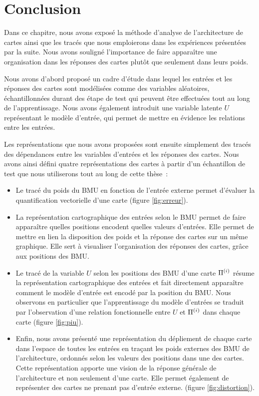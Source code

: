 \documentclass[../main]{subfiles}
\begin{document}
\section{Conclusion}

Dans ce chapitre, nous avons exposé la méthode d'analyse de l'architecture de cartes ainsi que les tracés que nous emploierons dans les expériences présentées par la suite. 
Nous avons souligné l'importance de faire apparaître une organisation dans les réponses des cartes plutôt que seulement dans leurs poids.

Nous avons d'abord proposé un cadre d'étude dans lequel les entrées et les réponses des cartes sont modélisées comme des variables aléatoires, échantillonnées durant des étape de test qui peuvent être effectuées tout au long de l'apprentissage.
Nous avons également introduit une variable latente $U$ représentant le modèle d'entrée, qui permet de mettre en évidence les relations entre les entrées. 


Les représentations que nous avons proposées sont ensuite simplement des tracés des dépendances entre les variables d'entrées et les réponses des cartes. Nous avons ainsi défini quatre représentations des cartes à partir d'un échantillon de test que nous utiliserons tout au long de cette thèse~:
\begin{itemize}
    \item Le tracé du poids du BMU en fonction de l'entrée externe permet d'évaluer la quantification vectorielle d'une carte (figure \ref{fig:erreur}).
    \item La représentation cartographique des entrées selon le BMU permet de faire apparaître quelles positions encodent quelles valeurs d'entrées. Elle permet de mettre en lien la disposition des poids et la réponse des cartes sur un même graphique. Elle sert à visualiser l'organisation des réponses des cartes, grâce aux positions des BMU.
    \item Le tracé de la variable $U$ selon les positions des BMU d'une carte $\Pi^{({i})}$ résume la représentation cartographique des entrées et fait directement apparaître comment le modèle d'entrée est encodé par la position du BMU.
    Nous observons en particulier que l'apprentissage du modèle d'entrées se traduit par l'observation d'une relation fonctionnelle entre $U$ et $\Pi^{({i})}$ dans chaque carte (figure \ref{fig:piu}).
    \item Enfin, nous avons présenté une représentation du dépliement de chaque carte dans l'espace de toutes les entrées en traçant les poids externes des BMU de l'architecture, ordonnés selon les valeurs des positions dans une des cartes. Cette représentation apporte une vision de la réponse générale de l'architecture et non seulement d'une carte. Elle permet également de représenter des cartes ne prenant pas d'entrée externe. (figure \ref{fig:distortion}).
\end{itemize}
\end{document}
